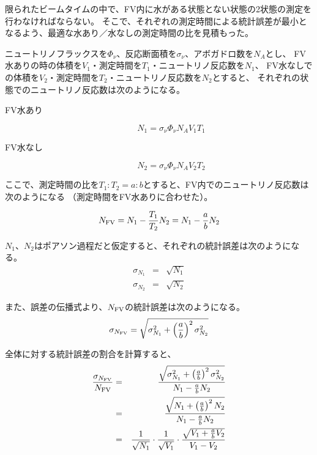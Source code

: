 限られたビームタイムの中で、FV内に水がある状態とない状態の2状態の測定を行わなければならない。
そこで、それぞれの測定時間による統計誤差が最小となるよう、最適な水あり／水なしの測定時間の比を見積もった。

ニュートリノフラックスを$\Phi_{\nu}$、反応断面積を$\sigma_{\nu}$、アボガドロ数を$N_{A}$とし、
FV水ありの時の体積を$V_{1}$・測定時間を$T_{1}$・ニュートリノ反応数を$N_{1}$、
FV水なしでの体積を$V_{2}$・測定時間を$T_{2}$・ニュートリノ反応数を$N_{2}$とすると、
それぞれの状態でのニュートリノ反応数は次のようになる。

\begin{description}
\item [FV水あり]%
\begin{equation}
N_{1} = \sigma_{\nu}\Phi_{\nu}N_{A}V_{1}T_{1}
\label{Nww}
\end{equation}
%
\item [FV水なし]
\begin{equation}
N_{2} = \sigma_{\nu}\Phi_{\nu}N_{A}V_{2}T_{2}
\label{Nwow}
\end{equation}
\end{description}

ここで、測定時間の比を$T_{1}:T_{2}=a:b$とすると、FV内でのニュートリノ反応数は次のようになる
（測定時間をFV水ありに合わせた）。

\begin{equation}
N_{\mathrm{FV}} = N_{1}-\frac{T_{1}}{T_{2}}N_{2} = N_{1}-\frac{a}{b}N_{2}
\label{Nfv}
\end{equation}

$N_{1}$、$N_{2}$はポアソン過程だと仮定すると、それぞれの統計誤差は次のようになる。
\begin{eqnarray}
\sigma_{N_{1}} & = & \sqrt{N_{1}} \label{sigma1}\\
\sigma_{N_{2}} & = & \sqrt{N_{2}} \label{sigma2}
\end{eqnarray}

また、誤差の伝播式より、$N_{\mathrm{FV}}$の統計誤差は次のようになる。
\begin{equation}
\sigma_{N_{\mathrm{FV}}} = \sqrt{\sigma_{N_{1}}^{2}+\left(\frac{a}{b}\right)^{2}\sigma_{N_{2}}^{2}} \label{sigmafv}
\end{equation}

全体に対する統計誤差の割合を計算すると、
\begin{eqnarray}
\frac{\sigma_{N_{\fv}}}{N_{\fv}} & = & \frac{\sqrt{\sigma_{N_{1}}^{2}+\left(\frac{a}{b}\right)^{2}\sigma_{N_{2}}^{2}}}{N_{1}-\frac{a}{b}N_{2}}\\
%
& = & \frac{\sqrt{N_{1} + \left(\frac{a}{b}\right)^{2}N_{2}}}{N_{1}-\frac{a}{b}N_{2}}\\
& = & \frac{1}{\sqrt{N_{1}}} \cdot%
\frac{1}{\sqrt{V_{1}}} \cdot%
\frac{\sqrt{V_{1}+\frac{a}{b}V_{2}}} {V_{1}-V_{2}}\\
\end{eqnarray}

